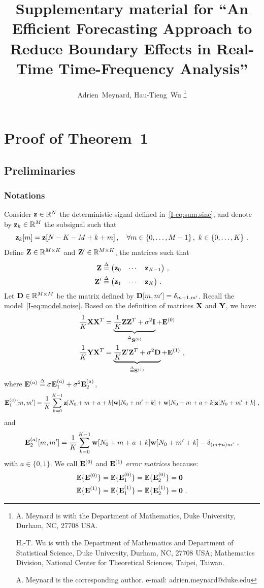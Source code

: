 \documentclass[journal,onecolumn]{IEEEtran}
\title{Supplementary material for ``An Efficient Forecasting Approach to Reduce Boundary Effects in Real-Time Time-Frequency Analysis''}
\author{Adrien~Meynard, %
        Hau-Tieng~Wu
\thanks{A. Meynard is with the Department
of Mathematics, Duke University, Durham,
NC, 27708 USA.

H.-T. Wu is with the Department of Mathematics and Department of Statistical Science, Duke University, Durham, NC, 27708 USA; Mathematics Division, National Center for Theoretical Sciences, Taipei, Taiwan.
 
A. Meynard is the corresponding author. e-mail: adrien.meynard@duke.edu}}
\begin{document}
\maketitle


\section{Proof of Theorem~1}
\label{ap:th.error}

\subsection{Preliminaries}

\subsubsection{Notations}
Consider ${\mathbf z}\in{\mathbb R}^N$ the deterministic signal defined in~\eqref{I-eq:sum.sine}, and denote by ${\mathbf z}_k\in{\mathbb R}^M$ the subsignal such that
\[
{\mathbf z}_k[m] = {\mathbf z}[N-K-M+k+m]\,,\quad \forall m\in\{0,\ldots,M-1\}\,,\ k\in\{0,\ldots,K\}\ .
\]
Define ${\mathbf Z}\in{\mathbb R}^{M \times K}$ and ${\mathbf Z}'\in{\mathbb R}^{M \times K}$, the matrices such that
\begin{align*}
{\mathbf Z} &\overset{\Delta}{=} \begin{pmatrix}
{\mathbf z}_0 & \cdots & {\mathbf z}_{K-1}
\end{pmatrix}\,,\\ 
{\mathbf Z}' &\overset{\Delta}{=} \begin{pmatrix}
{\mathbf z}_1 & \cdots & {\mathbf z}_{K}
\end{pmatrix}\,.
\end{align*}
Let ${\mathbf D}\in{\mathbb R}^{M\times M}$ be the matrix defined by ${\mathbf D}[m,m']=\delta_{m+1,m'}$. Recall the model~\eqref{I-eq:model.noise}. Based on the definition of matrices ${\mathbf X}$ and ${\mathbf Y}$, we have:
\begin{align}
\label{eq:XX.T}
\dfrac1K\bX\bX^T &= \underbrace{\dfrac1K\bZ\bZ^T+\sigma^2\bI}_{\defeq \bS^{(0)}} + \bE^{(0)} \\
\label{eq:YX.T}
\dfrac1K\bY\bX^T &= \underbrace{\dfrac1K\bZ'\bZ^T +\sigma^2\bD}_{\defeq \bS^{(1)}}+ \bE^{(1)} \ ,
\end{align}
where ${\mathbf E}^{(a)} \overset{\Delta}{=} \sigma{\mathbf E}_1^{(a)} + \sigma^2{\mathbf E}_2^{(a)}$,
\[
{\mathbf E}_1^{(a)}[m,m'] = \dfrac1K\sum_{k=0}^{K-1} {\mathbf z}[N_0+m+a+k]{\mathbf w}[N_0+m'+k] + {\mathbf w}[N_0+m+a+k]{\mathbf z}[N_0+m'+k]\ ,
\]
and
\[
{\mathbf E}_2^{(a)}[m,m'] =  \dfrac1K\sum_{k=0}^{K-1} {\mathbf w}[N_0+m+a+k]{\mathbf w}[N_0+m'+k] - \delta_{(m+a)m'}\ ,
\]
with $a\in\{0,1\}$.
We call ${\mathbf E}^{(0)}$ and ${\mathbf E}^{(1)}$ {\em error matrices} because:
\begin{align*}
{\mathbb E}\{{\mathbf E}^{(0)}\} &= {\mathbb E}\{{\mathbf E}_1^{(0)}\} = {\mathbb E}\{{\mathbf E}_2^{(0)}\} = \boldsymbol{0} \\
{\mathbb E}\{{\mathbf E}^{(1)}\} &= {\mathbb E}\{{\mathbf E}_1^{(1)}\} = {\mathbb E}\{{\mathbf E}_2^{(1)}\} = \boldsymbol{0}\ .
\end{align*}
\end{document}
